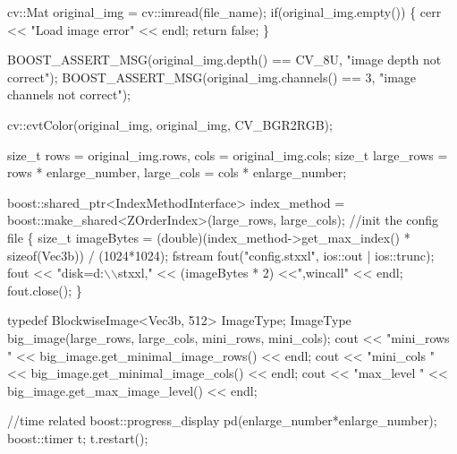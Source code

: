 \begin{DoxyCodeInclude}
        cv::Mat original\_img = cv::imread(file\_name);
        \textcolor{keywordflow}{if}(original\_img.empty()) \{
                cerr << \textcolor{stringliteral}{"Load image error"} << endl;
                \textcolor{keywordflow}{return} \textcolor{keyword}{false};
        \}

        BOOST\_ASSERT\_MSG(original\_img.depth() == CV\_8U, \textcolor{stringliteral}{"image depth not
       correct"});
        BOOST\_ASSERT\_MSG(original\_img.channels() == 3, \textcolor{stringliteral}{"image channels not
       correct"});

        cv::cvtColor(original\_img, original\_img, CV\_BGR2RGB);

        \textcolor{keywordtype}{size\_t} rows = original\_img.rows, cols = original\_img.cols;
        \textcolor{keywordtype}{size\_t} large\_rows = rows * enlarge\_number, large\_cols = cols * 
      enlarge\_number;

        boost::shared\_ptr<IndexMethodInterface> index\_method = 
      boost::make\_shared<ZOrderIndex>(large\_rows, large\_cols);
        \textcolor{comment}{//init the config file}
        \{
                \textcolor{keywordtype}{size\_t} imageBytes = (double)(index\_method->get\_max\_index() * \textcolor{keyword}{
      sizeof}(Vec3b)) / (1024*1024);
                fstream fout(\textcolor{stringliteral}{"config.stxxl"}, ios::out | ios::trunc);
                fout << \textcolor{stringliteral}{"disk=d:\(\backslash\)\(\backslash\)stxxl,"} << (imageBytes * 2) <<\textcolor{stringliteral}{",wincall"} << 
      endl;
                fout.close();
        \}

        \textcolor{keyword}{typedef} BlockwiseImage<Vec3b, 512> ImageType;
        ImageType big\_image(large\_rows, large\_cols, mini\_rows, mini\_cols);
        cout << \textcolor{stringliteral}{"mini\_rows "} << big\_image.get\_minimal\_image\_rows() << endl;
        cout << \textcolor{stringliteral}{"mini\_cols "} << big\_image.get\_minimal\_image\_cols() << endl;
        cout << \textcolor{stringliteral}{"max\_level "} << big\_image.get\_max\_image\_level() << endl;

        \textcolor{comment}{//time related}
        boost::progress\_display pd(enlarge\_number*enlarge\_number);
        boost::timer t;
        t.restart();


\end{DoxyCodeInclude}
